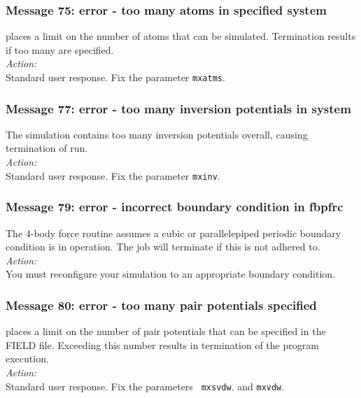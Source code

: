 \subsubsection*{Message 75: error - too many atoms in specified system}

\D{} places a limit on the number of atoms that can be simulated.
Termination results if too many are specified.  \\ 

\noindent
{\em Action:} \\ 
Standard user response. Fix the parameter {\tt mxatms}.

\subsubsection*{Message 77: error - too many inversion
potentials  in system}

The simulation contains too many inversion potentials overall, causing
termination of run.\\

\noindent
{\em Action:}\\
Standard user response. Fix the parameter {\tt mxinv}.

\subsubsection*{Message 79: error - incorrect boundary
condition  in fbpfrc}

The 4-body  force routine assumes a
cubic  or parallelepiped  periodic
boundary condition is in operation. The job will terminate if this is
not adhered to.\\

\noindent
{\em Action:}\\
You must reconfigure your simulation to an appropriate boundary
condition.

\subsubsection*{Message 80: error - too many pair potentials specified}

\D{} places a limit on the number of pair potentials that can be
specified in the FIELD file. Exceeding this number results in
termination of the program execution. \\ 

\noindent
{\em Action:} \\Standard user response. Fix the parameters {\tt
 mxsvdw}. and {\tt mxvdw}.

